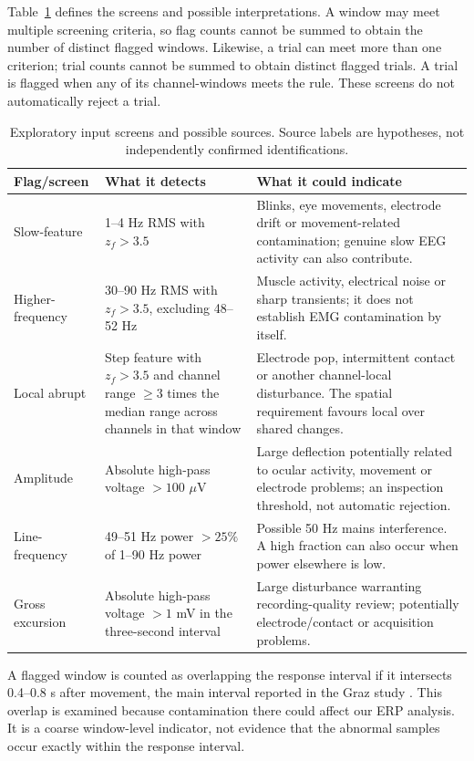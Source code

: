 \documentclass[11pt,a4paper]{article}
\newcommand{\uv}{\ensuremath{\mu\mathrm{V}}}
\begin{document}
Table~\ref{tab:screens} defines the screens and possible interpretations. A window may meet multiple screening criteria, so flag counts cannot be summed to obtain the number of distinct flagged windows. Likewise, a trial can meet more than one criterion; trial counts cannot be summed to obtain distinct flagged trials. A trial is flagged when any of its channel-windows meets the rule. These screens do not automatically reject a trial.

\begin{table}[H]\centering\small
\renewcommand{\arraystretch}{1.15}
\begin{tabularx}{\linewidth}{@{}p{.18\linewidth}p{.34\linewidth}X@{}}\toprule
Flag/screen & What it detects & What it could indicate\\\midrule
Slow-feature & 1--4 Hz RMS with $z_f>3.5$ & Blinks, eye movements, electrode drift or movement-related contamination; genuine slow EEG activity can also contribute.\\[4pt]
Higher-frequency & 30--90 Hz RMS with $z_f>3.5$, excluding 48--52 Hz & Muscle activity, electrical noise or sharp transients; it does not establish EMG contamination by itself.\\[4pt]
Local abrupt & Step feature with $z_f>3.5$ and channel range $\geq3$ times the median range across channels in that window & Electrode pop, intermittent contact or another channel-local disturbance. The spatial requirement favours local over shared changes.\\[4pt]
Amplitude & Absolute high-pass voltage $>100$ \uv & Large deflection potentially related to ocular activity, movement or electrode problems; an inspection threshold, not automatic rejection.\\[4pt]
Line-frequency & 49--51 Hz power $>25\%$ of 1--90 Hz power & Possible 50 Hz mains interference. A high fraction can also occur when power elsewhere is low.\\[4pt]
Gross excursion & Absolute high-pass voltage $>1$ mV in the three-second interval & Large disturbance warranting recording-quality review; potentially electrode/contact or acquisition problems.\\\bottomrule
\end{tabularx}
\caption{Exploratory input screens and possible sources. Source labels are hypotheses, not independently confirmed identifications.}\label{tab:screens}
\end{table}

A flagged window is counted as overlapping the response interval if it intersects 0.4--0.8 s after movement, the main interval reported in the Graz study \cite{graz}. This overlap is examined because contamination there could affect our ERP analysis. It is a coarse window-level indicator, not evidence that the abnormal samples occur exactly within the response interval.
\end{document}
